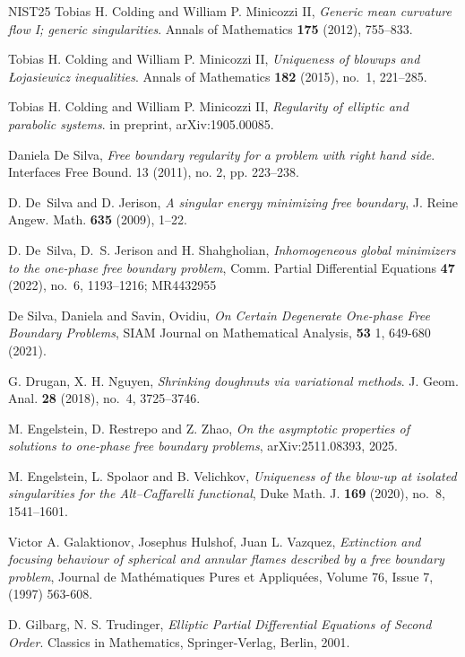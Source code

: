 \documentclass[11pt]{article}
\numberwithin{equation}{section}
\theoremstyle{definition}
\begin{document}
\begin{thebibliography}{NIST25}
 Tobias H. Colding and William P. Minicozzi II, \textit{Generic mean curvature flow I;
generic singularities}. Annals of Mathematics {\bf 175} (2012), 755--833.

 Tobias H. Colding and William P. Minicozzi II, \textit{Uniqueness of blowups and {\L}ojasiewicz inequalities}. Annals of Mathematics {\bf 182} (2015), no.~1, 221--285.

 Tobias H. Colding and William P. Minicozzi II, \textit{Regularity of elliptic and parabolic systems}. in preprint, 	arXiv:1905.00085.

 Daniela De Silva, \textit{Free boundary regularity for a problem with right hand side}. Interfaces Free Bound. 13 (2011), no. 2, pp. 223–238.

 D. De~Silva and D. Jerison, \textit{A singular energy minimizing free boundary}, J. Reine Angew. Math. {\bf 635} (2009), 1--22.

 D. De~Silva, D.~S. Jerison and H. Shahgholian, \textit{Inhomogeneous global minimizers to the one-phase free boundary problem}, Comm. Partial Differential Equations {\bf 47} (2022), no.~6, 1193--1216; MR4432955

 De Silva, Daniela and Savin, Ovidiu, \textit{On Certain Degenerate One-phase Free Boundary Problems}, SIAM Journal on Mathematical Analysis, \textbf{53} 1, 649-680 (2021).

 G. Drugan, X. H. Nguyen, \textit{Shrinking doughnuts via variational methods}. J. Geom. Anal. {\bf 28} (2018), no.~4, 3725--3746.

 M. Engelstein, D. Restrepo and Z. Zhao, \textit{On the asymptotic properties of solutions to one-phase free boundary problems}, arXiv:2511.08393, 2025.

 M. Engelstein, L. Spolaor and B. Velichkov, \textit{Uniqueness of the blow-up at isolated singularities for the Alt--Caffarelli functional}, Duke Math. J. {\bf 169} (2020), no.~8, 1541--1601.

 Victor A. Galaktionov, Josephus Hulshof, Juan L. Vazquez, \textit{Extinction and focusing behaviour of spherical and annular flames described by a free boundary problem}, Journal de Math\'ematiques Pures et Appliqu\'ees, Volume 76, Issue 7, (1997) 563-608.

 D. Gilbarg, N. S. Trudinger, \textit{Elliptic Partial Differential Equations of Second Order}. Classics in Mathematics, Springer-Verlag, Berlin, 2001.


\end{thebibliography}
\end{document}

